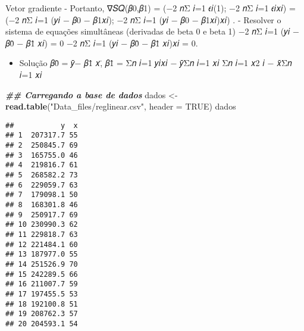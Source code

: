 \documentclass[
]{article}
\newenvironment{Shaded}{\begin{snugshade}}{\end{snugshade}}
\newcommand{\AttributeTok}[1]{\textcolor[rgb]{0.13,0.29,0.53}{#1}}
\newcommand{\CommentTok}[1]{\textcolor[rgb]{0.56,0.35,0.01}{\textit{#1}}}
\newcommand{\ConstantTok}[1]{\textcolor[rgb]{0.56,0.35,0.01}{#1}}
\newcommand{\DecValTok}[1]{\textcolor[rgb]{0.00,0.00,0.81}{#1}}
\newcommand{\DocumentationTok}[1]{\textcolor[rgb]{0.56,0.35,0.01}{\textbf{\textit{#1}}}}
\newcommand{\FunctionTok}[1]{\textcolor[rgb]{0.13,0.29,0.53}{\textbf{#1}}}
\newcommand{\NormalTok}[1]{#1}
\newcommand{\OtherTok}[1]{\textcolor[rgb]{0.56,0.35,0.01}{#1}}
\newcommand{\SpecialCharTok}[1]{\textcolor[rgb]{0.81,0.36,0.00}{\textbf{#1}}}
\newcommand{\StringTok}[1]{\textcolor[rgb]{0.31,0.60,0.02}{#1}}
\providecommand{\tightlist}{%
  \setlength{\itemsep}{0pt}\setlength{\parskip}{0pt}}
\begin{document}
Vetor gradiente - Portanto, ∇𝑆𝑄(𝛽0,𝛽1) = (−2 𝑛Σ 𝑖=1 𝜖𝑖(1); −2 𝑛Σ 𝑖=1
𝜖𝑖𝑥𝑖) = (−2 𝑛Σ 𝑖=1 (𝑦𝑖 − 𝛽0 − 𝛽1𝑥𝑖); −2 𝑛Σ 𝑖=1 (𝑦𝑖 − 𝛽0 − 𝛽1𝑥𝑖)𝑥𝑖) . -
Resolver o sistema de equações simultâneas (derivadas de beta 0 e beta
1) −2 𝑛Σ 𝑖=1 (𝑦𝑖 − 𝛽0̂ − 𝛽1̂ 𝑥𝑖) = 0 −2 𝑛Σ 𝑖=1 (𝑦𝑖 − 𝛽0̂ − 𝛽1̂ 𝑥𝑖)𝑥𝑖 = 0.

\begin{itemize}
\tightlist
\item
  Solução 𝛽0̂ = 𝑦̄− 𝛽1̂ 𝑥,̄ 𝛽1̂ = Σ𝑛 𝑖=1 𝑦𝑖𝑥𝑖 − 𝑦̄Σ𝑛 𝑖=1 𝑥𝑖 Σ𝑛 𝑖=1 𝑥2 𝑖 − 𝑥̄Σ𝑛
  𝑖=1 𝑥𝑖
\end{itemize}

\begin{Shaded}
\begin{Highlighting}[]
\DocumentationTok{\#\# Carregando a base de dados}
\NormalTok{dados }\OtherTok{\textless{}{-}} \FunctionTok{read.table}\NormalTok{(}\StringTok{"Data\_files/reglinear.csv"}\NormalTok{,}
                    \AttributeTok{header =} \ConstantTok{TRUE}\NormalTok{)}
\NormalTok{dados}
\end{Highlighting}
\end{Shaded}

\begin{verbatim}
##           y  x
## 1  207317.7 55
## 2  250845.7 69
## 3  165755.0 46
## 4  219816.7 61
## 5  268582.2 73
## 6  229059.7 63
## 7  179098.1 50
## 8  168301.8 46
## 9  250917.7 69
## 10 230990.3 62
## 11 229818.7 63
## 12 221484.1 60
## 13 187977.0 55
## 14 251526.9 70
## 15 242289.5 66
## 16 211007.7 59
## 17 197455.5 53
## 18 192100.8 51
## 19 208762.3 57
## 20 204593.1 54
\end{verbatim}

\begin{Shaded}
\end{Shaded}
\end{document}
